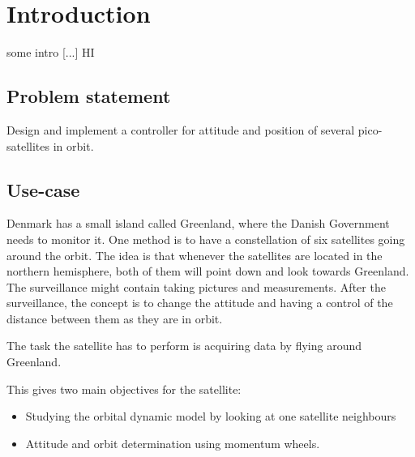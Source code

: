 \chapter{Introduction}\label{chap:Introduction}
%
\cite{Biezl}
some intro [...]
HI
%
\section{Problem statement}
%
Design and implement a controller for attitude and position of several pico-satellites in orbit.
%
\section{Use-case}\label{sec:useCase}
%
Denmark has a small island called Greenland, where the Danish Government needs to monitor it.
One method is to have a constellation of six satellites going around the orbit. The idea is that whenever the satellites are located in the northern hemisphere, both of them will point down and look towards Greenland. The surveillance might contain taking pictures and measurements. After the surveillance, the concept is to change the attitude and having a control of the distance between them as they are in orbit.

The task the satellite has to perform is acquiring data by flying around Greenland.

This gives two main objectives for the satellite: 
\vspace{-0.5cm}
\begin{itemize}
	\item Studying the orbital dynamic model by looking at one satellite neighbours 
	\item Attitude and orbit determination using momentum wheels.
\end{itemize}
%